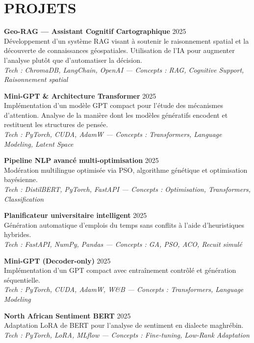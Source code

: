 \documentclass[a4paper,12pt]{article}
\begin{document}
\section{PROJETS}
\setlength{\parskip}{13pt}
{\small

\textbf{Geo-RAG — Assistant Cognitif Cartographique} \hfill 2025 \\
Développement d'un système RAG visant à soutenir le raisonnement spatial et la découverte de connaissances géospatiales. Utilisation de l'IA pour augmenter l'analyse plutôt que d'automatiser la décision. \\
\textit{Tech : ChromaDB, LangChain, OpenAI — Concepts : RAG, Cognitive Support, Raisonnement spatial}

\textbf{Mini-GPT \& Architecture Transformer} \hfill 2025 \\
Implémentation d'un modèle GPT compact pour l'étude des mécanismes d'attention. Analyse de la manière dont les modèles génératifs encodent et restituent les structures de pensée. \\
\textit{Tech : PyTorch, CUDA, AdamW — Concepts : Transformers, Language Modeling, Latent Space}

\textbf{Pipeline NLP avancé multi-optimisation} \hfill 2025 \\
Modération multilingue optimisée via PSO, algorithme génétique et optimisation bayésienne. \\
\textit{Tech : DistilBERT, PyTorch, FastAPI — Concepts : Optimisation, Transformers, Classification}

\textbf{Planificateur universitaire intelligent} \hfill 2025 \\
Génération automatique d’emplois du temps sans conflits à l’aide d’heuristiques hybrides. \\
\textit{Tech : FastAPI, NumPy, Pandas — Concepts : GA, PSO, ACO, Recuit simulé}

\textbf{Mini-GPT (Decoder-only)} \hfill 2025 \\
Implémentation d’un GPT compact avec entraînement contrôlé et génération séquentielle. \\
\textit{Tech : PyTorch, CUDA, AdamW, W\&B — Concepts : Transformers, Language Modeling}

\textbf{North African Sentiment BERT} \hfill 2025 \\
Adaptation LoRA de BERT pour l’analyse de sentiment en dialecte maghrébin. \\
\textit{Tech : PyTorch, LoRA, MLflow — Concepts : Fine-tuning, Low-Rank Adaptation}

}
\end{document}
